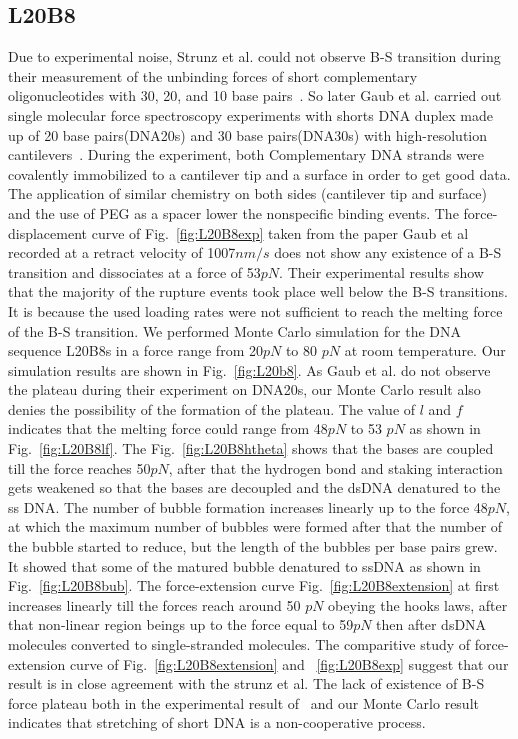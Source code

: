 \documentclass[12pt,masters,final]{UTRGVthesis}
\begin{document}
\subsection{L20B8}
%
 Due to experimental noise, Strunz et al. could not observe B-S transition during their measurement of the unbinding forces of short complementary oligonucleotides with 30, 20, and 10 base pairs~\cite{Strunz:1999}. So later Gaub et al. carried out single molecular force spectroscopy experiments with shorts DNA duplex made up of 20 base pairs(DNA20s) and 30 base pairs(DNA30s) with high-resolution cantilevers~\cite{Morfill:2007}. During the experiment, both Complementary DNA strands were covalently immobilized to a cantilever tip and a surface in order to get good data. The application of similar chemistry on both sides (cantilever tip and surface) and the use of PEG as a spacer lower the nonspecific binding events. The force-displacement curve of Fig.~\ref{fig:L20B8exp} taken from the paper Gaub et al~\cite{Morfill:2007} recorded at a retract velocity of 1007$nm/s$ does not show any existence of a B-S transition and dissociates at a force of 53$pN$. Their experimental results show that the majority of the rupture events took place well below the B-S transitions. It is because the used loading rates were not sufficient to reach the melting force of the B-S transition. We performed Monte Carlo simulation for the DNA sequence L20B8s in a force range from 20$pN$ to 80 $pN$ at room temperature. Our simulation results are shown in Fig.~\ref{fig:L20b8}. As Gaub et al. do not observe the plateau during their experiment on DNA20s, our Monte Carlo result also denies the possibility of the formation of the plateau. The value of $l$ and $f$ indicates that the melting force could range from 48$pN$ to 53 $pN$ as shown in Fig.~\ref{fig:L20B8lf}. The Fig.~\ref{fig:L20B8htheta} shows that the bases are coupled till the force reaches 50$pN$, after that the hydrogen bond and staking interaction gets weakened so that the bases are decoupled and the dsDNA denatured to the ss DNA. The number of bubble formation increases linearly up to the force 48$pN$, at which the maximum number of bubbles were formed after that the number of the bubble started to reduce, but the length of the bubbles per base pairs grew. It showed that some of the matured bubble denatured to ssDNA as shown in Fig.~\ref{fig:L20B8bub}. The force-extension curve Fig.~\ref{fig:L20B8extension} at first increases linearly till the forces reach around 50 $pN$ obeying the hooks laws, after that non-linear region beings up to the force equal to  59$pN$ then after dsDNA molecules converted to single-stranded molecules. The comparitive study of force-extension curve of  Fig.~\ref{fig:L20B8extension} and ~\ref{fig:L20B8exp} suggest that our result is in close agreement with the strunz et al. The lack of existence of B-S force plateau both in the experimental result of~\cite{Morfill:2007} and our Monte Carlo result indicates that stretching of short DNA is a non-cooperative process. 
\end{document}

